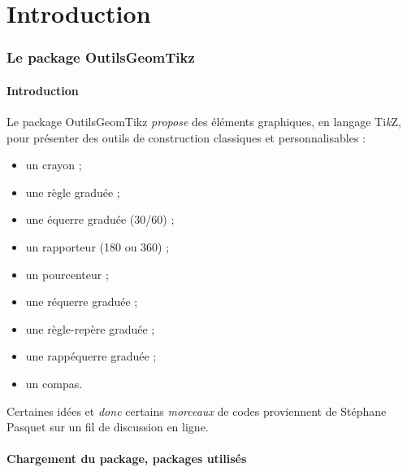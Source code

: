 \documentclass[french,a4paper,11pt]{article}
\providecommand\tikzlogo{Ti\textit{k}Z}
\let\TikZ\tikzlogo
\begin{document}
\vspace{1cm}

\newpage

\part{Introduction}

\section{Le package OutilsGeomTikz}

\subsection{Introduction}

\begin{noteblock}
Le package \textsf{OutilsGeomTikz} \textit{propose} des éléments graphiques, en langage \TikZ, pour présenter des outils de construction classiques et personnalisables :

\begin{itemize}
	\item un crayon ;
	\item une règle graduée ;
	\item une équerre graduée (30/60) ;
	\item un rapporteur (180 ou 360) ;
	\item un pourcenteur ;
	\item une réquerre graduée ;
	\item une \og règle-repère \fg{} graduée ;
	\item une \og rappéquerre \fg{} graduée ;
	\item un compas.
\end{itemize}
\vspace*{-\baselineskip}\leavevmode
\end{noteblock}

\begin{cautionblock}
Certaines idées et \textit{donc} certains \textit{morceaux} de codes proviennent de Stéphane Pasquet\footnotemark{} sur un fil de discussion en ligne.
\end{cautionblock}

\subsection{Chargement du package, packages utilisés}
\end{document}
